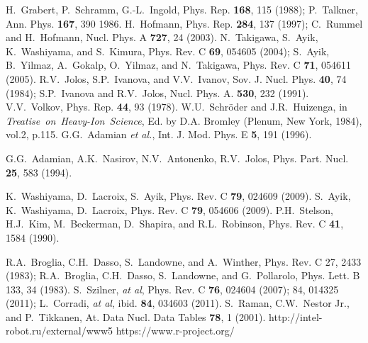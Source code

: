 \documentclass[preprint,review,12pt]{elsarticle}
\begin{document}
\begin{thebibliography}{99}
     H.~Grabert, P.~Schramm, G.-L.~Ingold, Phys. Rep. {\bf 168}, 115 (1988);
                      P.~Talkner, Ann. Phys. {\bf 167}, 390 1986.
      H.~Hofmann, Phys. Rep.  {\bf 284}, 137 (1997);
                      C.~Rummel and H.~Hofmann, Nucl. Phys. A {\bf 727}, 24 (2003).
        N.~Takigawa, S.~Ayik, K.~Washiyama, and S.~Kimura, Phys. Rev. C {\bf 69}, 054605 (2004);
                      S.~Ayik, B.~Yilmaz, A.~Gokalp, O.~Yilmaz, and N.~Takigawa, Phys. Rev. C {\bf 71}, 054611 (2005).
       R.V.~Jolos, S.P.~Ivanova, and V.V.~Ivanov, Sov. J. Nucl. Phys. {\bf 40}, 74 (1984);
                      S.P.~Ivanova and R.V.~Jolos, Nucl. Phys. A. {\bf 530}, 232 (1991).
         V.V.~Volkov, Phys. Rep. {\bf 44}, 93 (1978).
    W.U.~Schr\"oder and  J.R.~Huizenga, in {\it Treatise~on~Heavy-Ion~Science},
                      Ed. by D.A. Bromley (Plenum, New York, 1984), vol.2, p.115.
       G.G.~Adamian {\it et al.}, Int. J.  Mod. Phys. E {\bf 5}, 191 (1996).



        G.G.~Adamian, A.K.~Nasirov, N.V.~Antonenko, R.V.~Jolos, Phys. Part. Nucl. {\bf 25}, 583 (1994).

        K.~Washiyama, D.~Lacroix, S.~Ayik, Phys. Rev. C {\bf 79}, 024609 (2009).
       S.~Ayik, K.~Washiyama, D.~Lacroix, Phys. Rev. C {\bf 79}, 054606 (2009).
     P.H.~Stelson, H.J.~Kim, M.~Beckerman, D.~Shapira, and R.L.~Robinson, Phys. Rev. C {\bf 41}, 1584 (1990).

     R.A.~Broglia, C.H.~Dasso, S.~Landowne, and A.~Winther, Phys. Rev. C 27, 2433 (1983);
  R.A.~Broglia, C.H.~Dasso, S.~Landowne, and G.~Pollarolo, Phys. Lett. B 133, 34 (1983).
     S.~Szilner, {\it at al}, Phys. Rev. C {\bf 76}, 024604 (2007); 84, 014325 (2011);
                      L.~Corradi, {\it at al}, ibid. {\bf 84}, 034603 (2011).
       S.~Raman, C.W.~Nestor Jr., and P.~Tikkanen, At. Data Nucl. Data Tables {\bf 78}, 1 (2001).
    http://intel-robot.ru/external/www5
    https://www.r-project.org/

\end{thebibliography}
\end{document}

